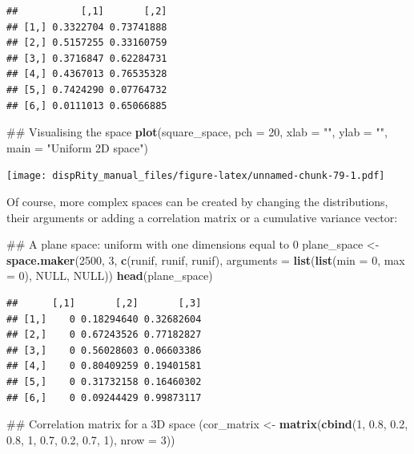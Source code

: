 \documentclass[]{book}
\newenvironment{Shaded}{\begin{snugshade}}{\end{snugshade}}
\newcommand{\KeywordTok}[1]{\textcolor[rgb]{0.13,0.29,0.53}{\textbf{#1}}}
\newcommand{\DataTypeTok}[1]{\textcolor[rgb]{0.13,0.29,0.53}{#1}}
\newcommand{\DecValTok}[1]{\textcolor[rgb]{0.00,0.00,0.81}{#1}}
\newcommand{\FloatTok}[1]{\textcolor[rgb]{0.00,0.00,0.81}{#1}}
\newcommand{\StringTok}[1]{\textcolor[rgb]{0.31,0.60,0.02}{#1}}
\newcommand{\OtherTok}[1]{\textcolor[rgb]{0.56,0.35,0.01}{#1}}
\newcommand{\NormalTok}[1]{#1}
\theoremstyle{definition}
\theoremstyle{definition}
\theoremstyle{remark}
\begin{document}
\begin{verbatim}
##           [,1]       [,2]
## [1,] 0.3322704 0.73741888
## [2,] 0.5157255 0.33160759
## [3,] 0.3716847 0.62284731
## [4,] 0.4367013 0.76535328
## [5,] 0.7424290 0.07764732
## [6,] 0.0111013 0.65066885
\end{verbatim}

\begin{Shaded}
\begin{Highlighting}[]
\NormalTok{## Visualising the space}
\KeywordTok{plot}\NormalTok{(square_space, }\DataTypeTok{pch =} \DecValTok{20}\NormalTok{, }\DataTypeTok{xlab =} \StringTok{""}\NormalTok{, }\DataTypeTok{ylab =} \StringTok{""}\NormalTok{, }\DataTypeTok{main =} \StringTok{"Uniform 2D space"}\NormalTok{)}
\end{Highlighting}
\end{Shaded}

\texttt{[image: dispRity\_manual\_files/figure-latex/unnamed-chunk-79-1.pdf]}

Of course, more complex spaces can be created by changing the
distributions, their arguments or adding a correlation matrix or a
cumulative variance vector:

\begin{Shaded}
\begin{Highlighting}[]
\NormalTok{## A plane space: uniform with one dimensions equal to 0}
\NormalTok{plane_space <-}\StringTok{ }\KeywordTok{space.maker}\NormalTok{(}\DecValTok{2500}\NormalTok{, }\DecValTok{3}\NormalTok{, }\KeywordTok{c}\NormalTok{(runif, runif, runif),}
                           \DataTypeTok{arguments =} \KeywordTok{list}\NormalTok{(}\KeywordTok{list}\NormalTok{(}\DataTypeTok{min =} \DecValTok{0}\NormalTok{, }\DataTypeTok{max =} \DecValTok{0}\NormalTok{), }\OtherTok{NULL}\NormalTok{, }\OtherTok{NULL}\NormalTok{))}
\KeywordTok{head}\NormalTok{(plane_space)}
\end{Highlighting}
\end{Shaded}

\begin{verbatim}
##      [,1]       [,2]       [,3]
## [1,]    0 0.18294640 0.32682604
## [2,]    0 0.67243526 0.77182827
## [3,]    0 0.56028603 0.06603386
## [4,]    0 0.80409259 0.19401581
## [5,]    0 0.31732158 0.16460302
## [6,]    0 0.09244429 0.99873117
\end{verbatim}

\begin{Shaded}
\begin{Highlighting}[]
\NormalTok{## Correlation matrix for a 3D space}
\NormalTok{(cor_matrix <-}\StringTok{ }\KeywordTok{matrix}\NormalTok{(}\KeywordTok{cbind}\NormalTok{(}\DecValTok{1}\NormalTok{, }\FloatTok{0.8}\NormalTok{, }\FloatTok{0.2}\NormalTok{, }\FloatTok{0.8}\NormalTok{, }\DecValTok{1}\NormalTok{, }\FloatTok{0.7}\NormalTok{, }\FloatTok{0.2}\NormalTok{, }\FloatTok{0.7}\NormalTok{, }\DecValTok{1}\NormalTok{), }\DataTypeTok{nrow =} \DecValTok{3}\NormalTok{))}
\end{Highlighting}
\end{Shaded}
\end{document}
